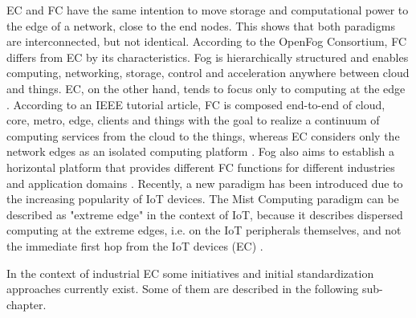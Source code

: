 EC and FC have the same intention to move storage and computational power to the edge of a network, close to the end nodes. This shows that both paradigms are interconnected, but not identical. According to the OpenFog Consortium, FC differs from EC by its characteristics. Fog is hierarchically structured and enables computing, networking, storage, control and acceleration anywhere between cloud and things. EC, on the other hand, tends to focus only to computing at the edge \cite{yousefpour2019all}. According to an IEEE tutorial article, FC is composed end-to-end of cloud, core, metro, edge, clients and things with the goal to realize a continuum of computing services from the cloud to the things, whereas EC considers only the network edges as an isolated computing platform \cite{chiang2017clarifying}. Fog also aims to establish a horizontal platform that provides different FC functions for different industries and application domains \cite{yousefpour2019all}.
Recently, a new paradigm has been introduced due to the increasing popularity of IoT devices. The Mist Computing paradigm can be described as "extreme edge" in the context of IoT, because it describes dispersed computing at the extreme edges, i.e. on the IoT peripherals themselves, and not the immediate first hop from the IoT devices (EC) \cite{yousefpour2019all}.

In the context of industrial EC some initiatives and initial standardization approaches currently exist. Some of them are described in the following sub-chapter. 

